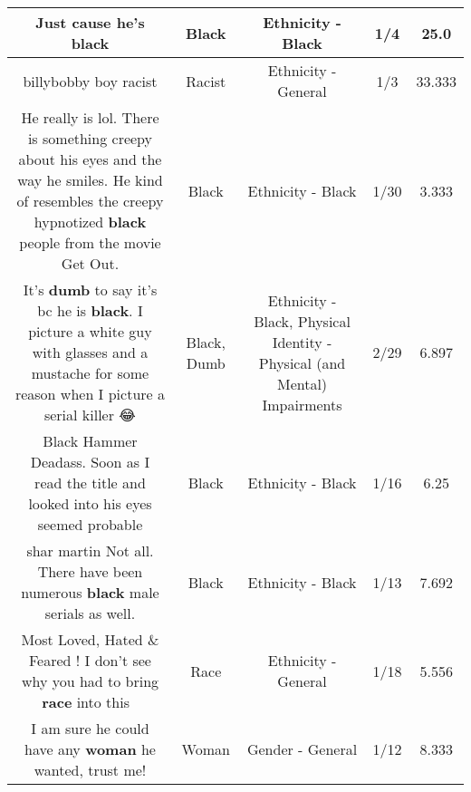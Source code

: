 \documentclass[11pt]{article}
\newlength\mylength
\begin{document}
\begin{center}
\begin{longtable}{|C{.65\mylength}|C{.30\mylength}|C{.12\mylength}|C{.12\mylength}|C{.12\mylength}|}
  \small Just cause he's black\normalsize   & Black & Ethnicity - Black & 1/4 & 25.0 \\  \hline
  \small billybobby boy racist\normalsize   & Racist & Ethnicity - General & 1/3 & 33.333 \\  \hline
  \small He really is lol. There is something creepy about his eyes and the way he smiles. He kind of resembles the creepy hypnotized \textbf{black} people from the movie Get Out.\normalsize   & Black & Ethnicity - Black & 1/30 & 3.333 \\  \hline
  \small It's \textbf{dumb} to say it's bc he is \textbf{black}. I picture a white guy with glasses and a mustache for some reason when I picture a serial killer 😂\normalsize   & Black, Dumb & Ethnicity - Black, Physical Identity - Physical (and Mental) Impairments & 2/29 & 6.897 \\  \hline
  \small Black Hammer Deadass. Soon as I read the title and looked into his eyes seemed probable\normalsize   & Black & Ethnicity - Black & 1/16 & 6.25 \\  \hline
  \small shar martin Not all.  There have been numerous \textbf{black} male serials as well.\normalsize   & Black & Ethnicity - Black & 1/13 & 7.692 \\  \hline
  \small Most Loved, Hated \& Feared ! I don't see why you had to bring \textbf{race} into this 😬\normalsize   & Race & Ethnicity - General & 1/18 & 5.556 \\  \hline
  \small I am sure he could have any \textbf{woman} he wanted, trust me!\normalsize   & Woman & Gender - General & 1/12 & 8.333 \\  \hline

\end{longtable}
\end{center}
\end{document}
